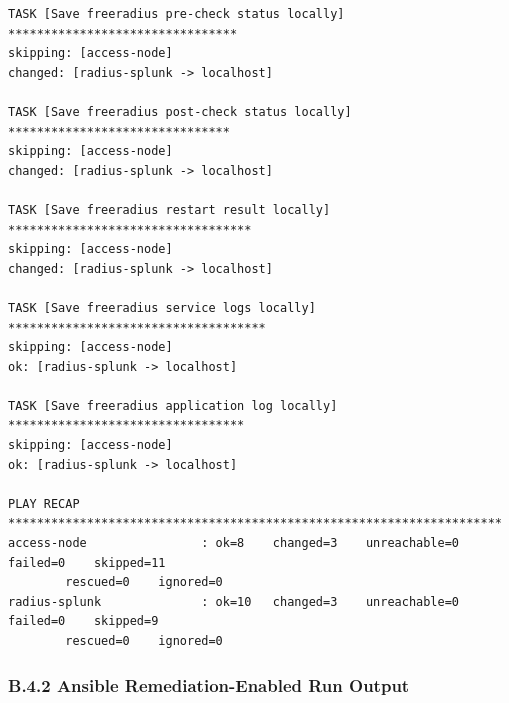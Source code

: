 \documentclass[11pt]{article}
\begin{document}
\begin{verbatim}
TASK [Save freeradius pre-check status locally] ********************************
skipping: [access-node]
changed: [radius-splunk -> localhost]

TASK [Save freeradius post-check status locally] *******************************
skipping: [access-node]
changed: [radius-splunk -> localhost]

TASK [Save freeradius restart result locally] **********************************
skipping: [access-node]
changed: [radius-splunk -> localhost]

TASK [Save freeradius service logs locally] ************************************
skipping: [access-node]
ok: [radius-splunk -> localhost]

TASK [Save freeradius application log locally] *********************************
skipping: [access-node]
ok: [radius-splunk -> localhost]

PLAY RECAP *********************************************************************
access-node                : ok=8    changed=3    unreachable=0    failed=0    skipped=11   
        rescued=0    ignored=0
radius-splunk              : ok=10   changed=3    unreachable=0    failed=0    skipped=9    
        rescued=0    ignored=0
\end{verbatim}


\subsubsection{B.4.2 Ansible Remediation-Enabled Run Output}
\label{sec:appendix-b-ansible-remediation-enabled-run-output}
\end{document}
